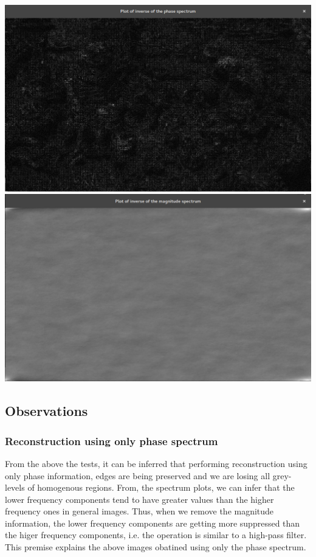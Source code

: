 \documentclass[a4paper,fleqn,11pt]{article}
\theoremstyle{mytheor}
\begin{document}
\begin{center}
\includegraphics[scale= 0.25]{../results/low_phase.png}
\includegraphics[scale= 0.25]{../results/low_magnitude.png}
\end{center}
\subsection*{Observations}
\subsubsection*{Reconstruction using only phase spectrum}
From the above the tests, it can be inferred that performing reconstruction using only phase information, edges are being preserved and we are losing all grey-levels of homogenous regions. From, the spectrum plots, we can infer that the lower frequency components tend to have greater values than the higher frequency ones in general images. Thus, when we remove the magnitude information, the lower frequency components are getting more suppressed than the higer frequency components, i.e. the operation is similar to a high-pass filter. This premise explains the above images obatined using only the phase spectrum.
\end{document}
